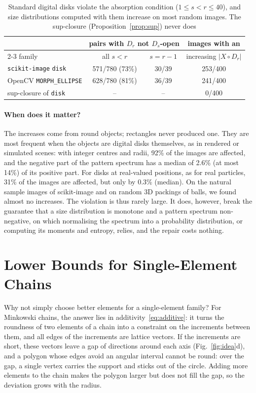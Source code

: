 \documentclass[runningheads]{llncs}
\begin{document}
\begin{table}[t]
\centering
\caption{Standard digital disks violate the absorption condition ($1\le s<r\le40$), and size distributions computed with them increase on most random images. The sup-closure (Proposition~\ref{prop:sup}) never does}\label{tab:violation}
\begin{tabular}{lccc}
\toprule
 & \multicolumn{2}{c}{pairs with $D_r$ not $D_s$-open} & images with an\\
\cmidrule(lr){2-3}
family & all $s<r$ & $s=r-1$ & increasing $|X\circ D_r|$\\
\midrule
\texttt{scikit-image} \texttt{disk} & 571/780 (73\%) & 30/39 & 253/400\\
OpenCV \texttt{MORPH\_ELLIPSE} & 628/780 (81\%) & 36/39 & 241/400\\
sup-closure of \texttt{disk} & -- & -- & 0/400\\
\bottomrule
\end{tabular}
\end{table}

\paragraph{When does it matter?} The increases come from round objects; rectangles never produced one. They are most frequent when the objects are digital disks themselves, as in rendered or simulated scenes: with integer centres and radii, 92\% of the images are affected, and the negative part of the pattern spectrum has a median of 2.6\% (at most 14\%) of its positive part. For disks at real-valued positions, as for real particles, 31\% of the images are affected, but only by 0.3\% (median). On the natural sample images of scikit-image and on random 3D packings of balls, we found almost no increases. The violation is thus rarely large. It does, however, break the guarantee that a size distribution is monotone and a pattern spectrum non-negative, on which normalising the spectrum into a probability distribution, or computing its moments and entropy, relies, and the repair costs nothing.

\section{Lower Bounds for Single-Element Chains}\label{sec:lower}
Why not simply choose better elements for a single-element family? For Minkowski chains, the answer lies in additivity~\eqref{eq:additive}: it turns the roundness of two elements of a chain into a constraint on the increments between them, and all edges of the increments are lattice vectors. If the increments are short, these vectors leave a gap of directions around each axis (Fig.~\ref{fig:idea}d), and a polygon whose edges avoid an angular interval cannot be round: over the gap, a single vertex carries the support and sticks out of the circle. Adding more elements to the chain makes the polygon larger but does not fill the gap, so the deviation grows with the radius.
\end{document}
